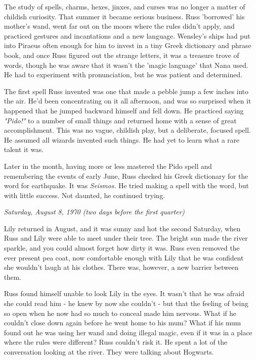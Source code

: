 \documentclass[a4paper,11pt]{article}
\begin{document}
The study of spells, charms, hexes, jinxes, and curses was no longer a matter of childish curiosity. That summer it became serious business. Russ 'borrowed' his mother's wand, went far out on the moors where the rules didn't apply, and practiced gestures and incantations and a new language. Wensley's ships had put into Piraeus often enough for him to invest in a tiny Greek dictionary and phrase book, and once Russ figured out the strange letters, it was a treasure trove of words, though he was aware that it wasn't the 'magic language' that Nana used. He had to experiment with pronunciation, but he was patient and determined.

The first spell Russ invented was one that made a pebble jump a few inches into the air. He'd been concentrating on it all afternoon, and was so surprised when it happened that he jumped backward himself and fell down. He practiced saying \emph{"Pido!"} to a number of small things and returned home with a sense of great accomplishment. This was no vague, childish play, but a deliberate, focused spell. He assumed all wizards invented such things. He had yet to learn what a rare talent it was.

Later in the month, having more or less mastered the Pido spell and remembering the events of early June, Russ checked his Greek dictionary for the word for earthquake. It was \emph{Seismos.} He tried making a spell with the word, but with little success. Not daunted, he continued trying.

\emph{Saturday, August 8, 1970 (two days before the first quarter)}

Lily returned in August, and it was sunny and hot the second Saturday, when Russ and Lily were able to meet under their tree. The bright sun made the river sparkle, and you could almost forget how dirty it was. Russ even removed the ever present pea coat, now comfortable enough with Lily that he was confident she wouldn't laugh at his clothes. There was, however, a new barrier between them.

Russ found himself unable to look Lily in the eyes. It wasn't that he was afraid she could read him - he knew by now she couldn't - but that the feeling of being so open when he now had so much to conceal made him nervous. What if he couldn't close down again before he went home to his mum? What if his mum found out he was using her wand and doing illegal magic, even if it was in a place where the rules were different? Russ couldn't risk it. He spent a lot of the conversation looking at the river. They were talking about Hogwarts.
\end{document}
